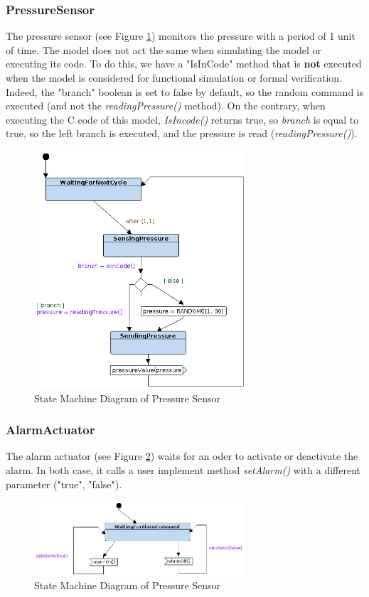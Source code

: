 \documentclass[12pt]{article}
\begin{document}
\subsubsection{PressureSensor}
The pressure sensor (see Figure \ref{fig:ps}) monitors the pressure with a period of 1 unit of time. The model does not act the same when simulating the model or executing its code. To do this, we have a "IsInCode" method that is \textbf{not} executed when the model is considered for functional simulation or formal verification. Indeed, the "branch" boolean is set to false by default, so the random command is executed (and not the \textit{readingPressure()} method). On the contrary, when executing the C code of this model, \textit{IsIncode()} returns true, so \textit{branch} is equal to true, so the left branch is executed, and the pressure is read (\textit{readingPressure()}).  
\begin{figure}[htbp]
\centering
\includegraphics[width=0.7\textwidth]{figures/pressuresensor}
\caption{State Machine Diagram of Pressure Sensor} \label{fig:ps}
\end{figure}

\subsubsection{AlarmActuator}
The alarm actuator (see Figure \ref{fig:aa}) waits for an oder to activate or deactivate the alarm. In both case, it calls a user implement method \textit{setAlarm()} with a different parameter ("true", "false").

\begin{figure}[htbp]
\centering
\includegraphics[width=0.7\textwidth]{figures/alarmactuator}
\caption{State Machine Diagram of Pressure Sensor} \label{fig:aa}
\end{figure}
\end{document}
